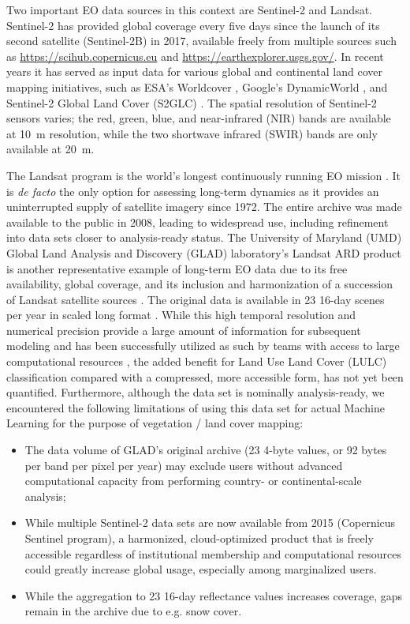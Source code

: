 Two important EO data sources in this context are Sentinel-2 and Landsat. 
Sentinel-2 has provided global coverage every five days since the launch of its second satellite (Sentinel-2B) in 2017, available freely from multiple sources such as \url{https://scihub.copernicus.eu} and \url{https://earthexplorer.usgs.gov/}. In recent years it has served as input data for various global and continental land cover mapping initiatives, such as ESA's Worldcover \citep{kerchove2021esa}, Google's DynamicWorld \citep{brown2022dynamic}, and Sentinel-2 Global Land Cover (S2GLC) \citep{malinowski2020automated}. The spatial resolution of Sentinel-2 sensors varies; the red, green, blue, and near-infrared (NIR) bands are available at 10~m resolution, while the two shortwave infrared (SWIR) bands are only available at 20~m.

The Landsat program is the world's longest continuously running EO mission \citep{wulder2022fifty}. It is \emph{de facto} the only option for assessing long-term dynamics as it provides an uninterrupted supply of satellite imagery since 1972. The entire archive was made available to the public in 2008, leading to widespread use, including refinement into data sets closer to analysis-ready status. The University of Maryland (UMD) Global Land Analysis and Discovery (GLAD) laboratory's Landsat ARD product is another representative example of long-term EO data due to its free availability, global coverage, and its inclusion and harmonization of a succession of Landsat satellite sources \citep{potapov2020landsat}. The original data is available in 23{\texttimes} 16-day scenes per year in scaled long format \citep{potapov2020landsat}. While this high temporal resolution and numerical precision provide a large amount of information for subsequent modeling and has been successfully utilized as such by teams with access to large computational resources \citep{hansen2022global}, the added benefit for Land Use Land Cover (LULC) classification compared with a compressed, more accessible form, has not yet been quantified. Furthermore, although the data set is nominally analysis-ready, we encountered the following limitations of using this data set for actual Machine Learning for the purpose of vegetation / land cover mapping:

\begin{itemize}[noitemsep]
\item The data volume of GLAD's original archive (23 4-byte values, or 92 bytes per band per pixel per year) may exclude users without advanced computational capacity from performing country- or continental-scale analysis;
\item While multiple Sentinel-2 data sets are now available from 2015 (Copernicus Sentinel program), a harmonized, cloud-optimized product that is freely accessible regardless of institutional membership and computational resources could greatly increase global usage, especially among marginalized users.
\item While the aggregation to 23 16-day reflectance values increases coverage, gaps remain in the archive due to e.g. snow cover.
\end{itemize}

